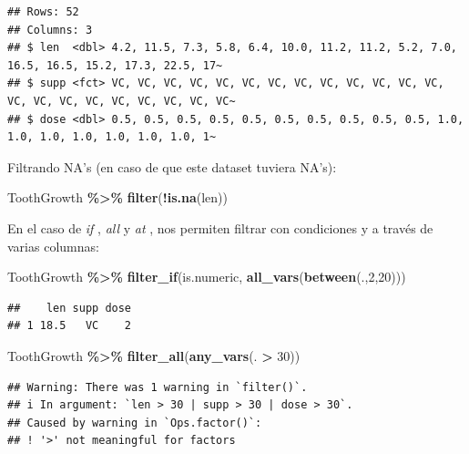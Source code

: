 \documentclass[
]{book}
\newenvironment{Shaded}{\begin{snugshade}}{\end{snugshade}}
\newcommand{\DecValTok}[1]{\textcolor[rgb]{0.00,0.00,0.81}{#1}}
\newcommand{\FunctionTok}[1]{\textcolor[rgb]{0.13,0.29,0.53}{\textbf{#1}}}
\newcommand{\NormalTok}[1]{#1}
\newcommand{\SpecialCharTok}[1]{\textcolor[rgb]{0.81,0.36,0.00}{\textbf{#1}}}
\begin{document}
\begin{verbatim}
## Rows: 52
## Columns: 3
## $ len  <dbl> 4.2, 11.5, 7.3, 5.8, 6.4, 10.0, 11.2, 11.2, 5.2, 7.0, 16.5, 16.5, 15.2, 17.3, 22.5, 17~
## $ supp <fct> VC, VC, VC, VC, VC, VC, VC, VC, VC, VC, VC, VC, VC, VC, VC, VC, VC, VC, VC, VC, VC, VC~
## $ dose <dbl> 0.5, 0.5, 0.5, 0.5, 0.5, 0.5, 0.5, 0.5, 0.5, 0.5, 1.0, 1.0, 1.0, 1.0, 1.0, 1.0, 1.0, 1~
\end{verbatim}

\hfill\break
Filtrando NA's (en caso de que este dataset tuviera NA's):

\begin{Shaded}
\begin{Highlighting}[]
\NormalTok{ToothGrowth }\SpecialCharTok{\%\textgreater{}\%} \FunctionTok{filter}\NormalTok{(}\SpecialCharTok{!}\FunctionTok{is.na}\NormalTok{(len))}
\end{Highlighting}
\end{Shaded}

\hfill\break
En el caso de \emph{if} , \emph{all} y \emph{at} , nos permiten filtrar con condiciones y a través de varias columnas:

\begin{Shaded}
\begin{Highlighting}[]
\NormalTok{ToothGrowth }\SpecialCharTok{\%\textgreater{}\%} \FunctionTok{filter\_if}\NormalTok{(is.numeric, }\FunctionTok{all\_vars}\NormalTok{(}\FunctionTok{between}\NormalTok{(.,}\DecValTok{2}\NormalTok{,}\DecValTok{20}\NormalTok{)))}
\end{Highlighting}
\end{Shaded}

\begin{verbatim}
##    len supp dose
## 1 18.5   VC    2
\end{verbatim}

\begin{Shaded}
\begin{Highlighting}[]
\NormalTok{ToothGrowth }\SpecialCharTok{\%\textgreater{}\%} \FunctionTok{filter\_all}\NormalTok{(}\FunctionTok{any\_vars}\NormalTok{(. }\SpecialCharTok{\textgreater{}} \DecValTok{30}\NormalTok{))}
\end{Highlighting}
\end{Shaded}

\begin{verbatim}
## Warning: There was 1 warning in `filter()`.
## i In argument: `len > 30 | supp > 30 | dose > 30`.
## Caused by warning in `Ops.factor()`:
## ! '>' not meaningful for factors
\end{verbatim}
\end{document}
